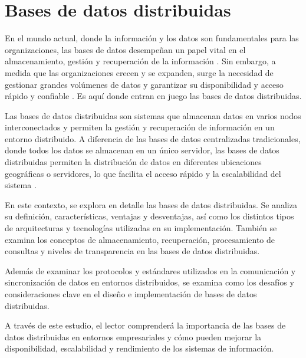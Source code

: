 \chapter{Bases de datos distribuidas}
\noindent
En el mundo actual, donde la información y los datos son fundamentales para las organizaciones, las bases de datos desempeñan un papel vital en el almacenamiento, gestión y recuperación de la información \cite{Vats2023BigData}. Sin embargo, a medida que las organizaciones crecen y se expanden, surge la necesidad de gestionar grandes volúmenes de datos y garantizar su disponibilidad y acceso rápido y confiable \cite{Ali2023Designing}. Es aquí donde entran en juego las bases de datos distribuidas.

Las bases de datos distribuidas son sistemas que almacenan datos en varios nodos interconectados y permiten la gestión y recuperación de información en un entorno distribuido. A diferencia de las bases de datos centralizadas tradicionales, donde todos los datos se almacenan en un único servidor, las bases de datos distribuidas permiten la distribución de datos en diferentes ubicaciones geográficas o servidores, lo que facilita el acceso rápido y la escalabilidad del sistema \cite{Pavithran2023Distributed}.

En este contexto, se explora en detalle las bases de datos distribuidas. Se analiza su definición, características, ventajas y desventajas, así como los distintos tipos de arquitecturas y tecnologías utilizadas en su implementación. También se examina los conceptos de almacenamiento, recuperación, procesamiento de consultas y niveles de transparencia en las bases de datos distribuidas.

Además de examinar los protocolos y estándares utilizados en la comunicación y sincronización de datos en entornos distribuidos, se examina como los desafíos y consideraciones clave en el diseño e implementación de bases de datos distribuidas.

A través de este estudio, el lector comprenderá la importancia de las bases de datos distribuidas en entornos empresariales y cómo pueden mejorar la disponibilidad, escalabilidad y rendimiento de los sistemas de información.

